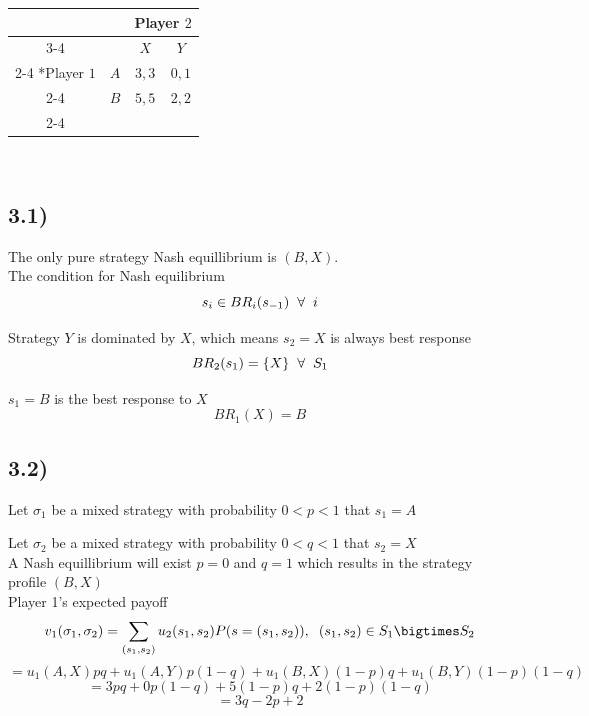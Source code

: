 \documentclass[a4paper,11pt]{article}
\begin{document}
\begin{table}[!htbp]
  \setlength{\extrarowheight}{2pt}
  \begin{center}
  \begin{tabular}{*{4}{c|}}
    \multicolumn{2}{c}{} & \multicolumn{2}{c}{Player $2$}\\\cline{3-4}
    \multicolumn{1}{c}{}       &     &   $X$ &   $Y$   \\\cline{2-4}
    \multirow{2}*{Player $1$}  & $A$ & $3,3$ & $0,1$ \\\cline{2-4}
                               & $B$ & $5,5$ & $2,2$ \\\cline{2-4}
  \end{tabular}\\
  \end{center}
\end{table}

\subsection*{3.1)}

The only pure strategy Nash equillibrium is $(B,X)$.\\

The condition for Nash equilibrium
\[ s_i \in BR_i(s_{-1}) \hspace{2mm} \forall \hspace{2mm} i \]

Strategy $Y$ is dominated by $X$, which means $s_2 = X$ is always best response\\
\[ BR_2(s_1) = \{X\} \hspace{2mm} \forall \hspace{2mm} S_1 \]

$s_1 = B$ is the best response to $X$
\[ BR_1(X) = B \]

\subsection*{3.2)}

Let $\sigma_1$ be a mixed strategy with probability $0 < p < 1$ that $s_1 = A$

Let $\sigma_2$ be a mixed strategy with probability $0 < q < 1$ that $s_2 = X$\\

A Nash equillibrium will exist $p = 0$ and $q = 1$ which results in the strategy profile $(B,X)$\\

Player 1's expected payoff
\[ v_1(\sigma_1, \sigma_2) = \sum_{(s_1, s_2)} u_2(s_1, s_2) P(s = (s_1, s_2)), \hspace{2mm} (s_1, s_2) \in S_1 \bigtimes S_2 \]
\[ = u_1(A,X)pq + u_1(A,Y)p(1 - q) + u_1(B,X)(1 - p)q + u_1(B,Y)(1 - p)(1 - q)\] 
\[ = 3pq + 0p(1 - q) + 5(1 - p)q + 2(1 - p)(1 - q) \] 
\[ =  3q  - 2p + 2 \]
\end{document}
